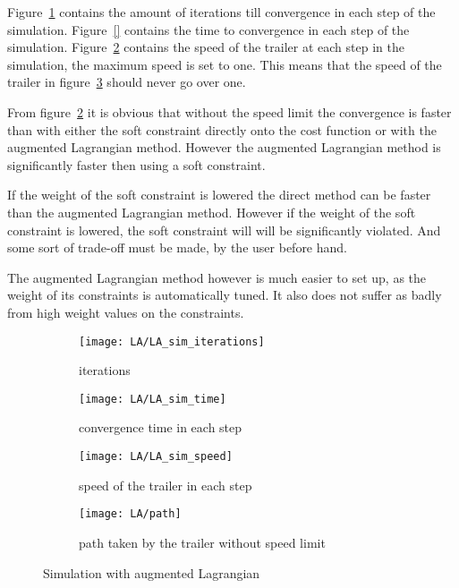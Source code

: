 Figure~\ref{fig:LA iterations} contains the amount of iterations till convergence in each step of the simulation. Figure~\ref{} contains the time to convergence in each step of the simulation. Figure~\ref{fig:LA time} contains the speed of the trailer at each step in the simulation, the maximum speed is set to one. This means that the speed of the trailer in figure~\ref{fig:LA speed} should never go over one.

From figure~\ref{fig:LA time} it is obvious that without the speed limit the convergence is faster than with either the soft constraint directly onto the cost function or with the augmented Lagrangian method. However the augmented Lagrangian method is significantly faster then using a soft constraint.

If the weight of the soft constraint is lowered the direct method can be faster than the augmented Lagrangian method. However if the weight of the soft constraint is lowered, the soft constraint will will be significantly violated. And some sort of trade-off must be made, by the user before hand.

The augmented Lagrangian method however is much easier to set up, as the weight of its constraints is automatically tuned. It also does not suffer as badly from high weight values on the constraints.

\begin{figure}[H]
	\centering
	\begin{subfigure}[b]{0.45\textwidth}
		\centering
		\texttt{[image: LA/LA\_sim\_iterations]}
		\caption{iterations}
		\label{fig:LA iterations}
	\end{subfigure}
	\hfill
	\begin{subfigure}[b]{0.45\textwidth}
		\centering
		\texttt{[image: LA/LA\_sim\_time]}
		\caption{convergence time in each step}
		\label{fig:LA time}
	\end{subfigure}
	\begin{subfigure}[b]{0.45\textwidth}
		\centering
		\texttt{[image: LA/LA\_sim\_speed]}
		\caption{speed of the trailer in each step}
		\label{fig:LA speed}
	\end{subfigure}
	\hfill
	\begin{subfigure}[b]{0.45\textwidth}
		\centering
		\texttt{[image: LA/path]}
		\caption{path taken by the trailer without speed limit}
		\label{fig:LA path}
	\end{subfigure}
	\caption{Simulation with augmented Lagrangian}
	\label{fig:simulation with augmented Lagrangian}
\end{figure}
